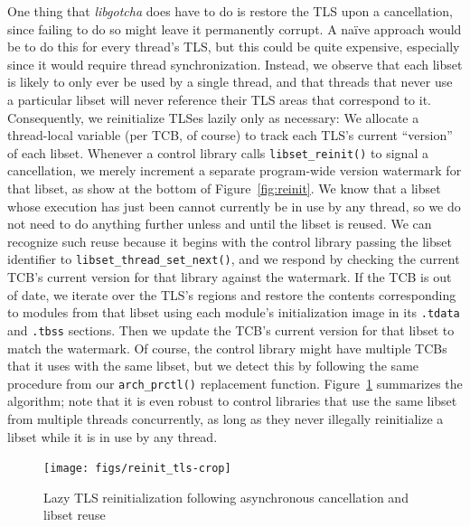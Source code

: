 One thing that \textit{libgotcha} does have to do is restore the TLS upon a
cancellation, since failing to do so might leave it permanently corrupt.  A na\"ive
approach would be to do this for every thread's TLS, but this could be quite
expensive, especially since it would require thread synchronization.  Instead, we
observe that each libset is likely to only ever be used by a single thread, and that
threads that never use a particular libset will never reference their TLS areas that
correspond to it.  Consequently, we reinitialize TLSes lazily only as necessary:
We allocate a thread-local variable (per TCB, of course) to track each TLS's current
``version'' of each libset.  Whenever a control library calls
\texttt{libset\_reinit()} to signal a cancellation, we merely increment a separate
program-wide version watermark for that libset, as show at the bottom of
Figure~\ref{fig:reinit}.  We know that a libset whose execution has just been
 cannot currently be in use by any thread, so we do not need to do
anything
further unless and until the libset is reused.  We can recognize such reuse because
it begins with the control library passing the libset identifier to
\texttt{libset\_thread\_set\_next()}, and we respond by checking the current TCB's
current version for that library against the watermark.  If the TCB is out of date,
we iterate over the TLS's regions and restore the contents corresponding to modules
from that libset using each module's initialization image in its \texttt{.tdata}
and \texttt{.tbss} sections.  Then we update the TCB's current version for that
libset to match the watermark.  Of course, the control library might have multiple
TCBs that it uses with the same libset, but we detect this by following the same
procedure from our \texttt{arch\_prctl()} replacement function.
Figure~\ref{fig:tlsreinit} summarizes the algorithm; note that it is even robust to
control libraries that use the same libset from multiple threads concurrently, as
long as they never illegally reinitialize a libset while it is in use by any thread.

\begin{figure}
\texttt{[image: figs/reinit\_tls-crop]}
\caption{Lazy TLS reinitialization following asynchronous cancellation and libset reuse}
\label{fig:tlsreinit}
\end{figure}

